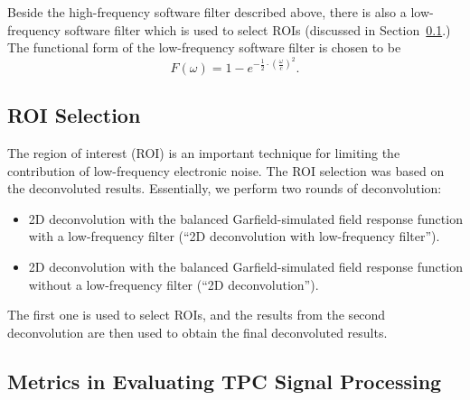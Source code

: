 Beside the high-frequency software filter described above, there is also a low-frequency 
software filter which is used to select ROIs (discussed in Section~\ref{sec:decon-roi-selection}.) %
The functional form of the low-frequency software filter is chosen to be 
\begin{equation}
F(\omega) = 1- e^{-\frac{1}{2}\cdot \left( \frac{\omega}{c} \right)^2}.
\end{equation}

\subsection{ROI Selection}
\label{sec:decon-roi-selection}

The region of interest (ROI) is an important technique for limiting the contribution of low-frequency 
electronic noise. The ROI selection was based on the deconvoluted results. Essentially, we perform
two rounds of deconvolution:
\begin{itemize}
\item 2D deconvolution with the balanced Garfield-simulated field response function with a low-frequency filter (``2D deconvolution with low-frequency filter'').
\item 2D deconvolution with the balanced Garfield-simulated field response function without a low-frequency filter (``2D deconvolution'').
\end{itemize}
The first one is used to select ROIs, and the results from the second deconvolution are then 
used to obtain the final deconvoluted results. 

\subsection{Metrics in Evaluating TPC Signal Processing}

